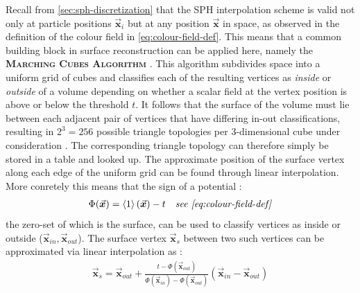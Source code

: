 \documentclass[oneside, a4paper]{book}
\newcommand\emphasis[1]{{\scshape\bfseries#1}}
\newcommand\angled[1]{\left\langle#1\right\rangle}
\newcommand\vek[1]{\vec{\bm{#1}}}
\newcommand\br[1]{\left(#1\right)}
\begin{document}
  Recall from \autoref{sec:sph-discretization} that the SPH interpolation scheme is valid not only at particle positions $\vek{x}_i$ but at any position $\vek{x}$ in space, as observed in the definition of the colour field in \autoref{eq:colour-field-def}. This means that a common building block in surface reconstruction can be applied here, namely the \emphasis{Marching Cubes Algorithm} \autocite{marching-cubes}. This algorithm subdivides space into a uniform grid of cubes and classifies each of the resulting vertices as \textit{inside} or \textit{outside} of a volume depending on whether a scalar field at the vertex position is above or below the threshold $t$. It follows that the surface of the volume must lie between each adjacent pair of vertices that have differing in-out classifications, resulting in $2^3=256$ possible triangle topologies per 3-dimensional cube under consideration \autocite{marching-cubes}. The corresponding triangle topology can therefore simply be stored in a table and looked up. The approximate position of the surface vertex along each edge of the uniform grid can be found through linear interpolation. More conretely this means that the sign of a potential \autocite{laplacian-surf-reconst}:
  \begin{align}
    \Phi(\vek{x}) &= \angled{1}\br{\vek{x}} - t &\textit{see \autoref{eq:colour-field-def}}
  \end{align} 
  the zero-set of which is the surface, can be used to classify vertices as inside or outside ($\vek{x}_{in}, \vek{x}_{out}$). The surface vertex $\vek{x}_s$ between two such vertices can be approximated via linear interpolation as \autocite{laplacian-surf-reconst}:
  \begin{align}
    \vek{x}_s = \vek{x}_{out} + \frac{t-\Phi(\vek{x}_{out})}{\Phi(\vek{x}_{in})-\Phi(\vek{x}_{out})} \br{\vek{x}_{in}-\vek{x}_{out}}
  \end{align}
  
\end{document}
